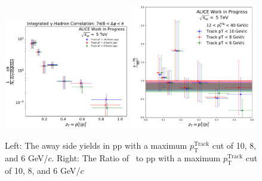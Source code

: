 \begin{figure}
\includegraphics[width=0.49\textwidth]{G-H_New/FF_Averages_Max_pT_pp.pdf}
\includegraphics[width=0.49\textwidth,height=0.42\textwidth]{G-H_New/Ratio_FF_Averages_Max_pT.pdf}
\caption{Left: The away side yields in pp with a maximum $p_\mathrm{T}^\mathrm{Track}$ cut of 10, 8, and 6 GeV/$c$. Right: The Ratio of \pPb~to pp with a maximum $p_\mathrm{T}^\mathrm{Track}$ cut of 10, 8, and 6 GeV/$c$}
\label{fig:FF_pT_Max_pp}
\end{figure}






